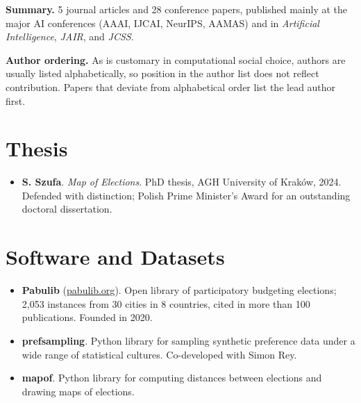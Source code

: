 \documentclass[11pt,a4paper]{article}
\begin{document}
\headercontactfalse
{}

\textbf{Summary.} 5 journal articles and 28 conference papers,
published mainly at the major AI conferences 
(AAAI, IJCAI, NeurIPS, AAMAS) and in
\emph{Artificial Intelligence}, \emph{JAIR}, and \emph{JCSS}.

\vspace{6pt}

\textbf{Author ordering.} As is customary in computational social choice,
authors are usually listed alphabetically, so position in the author list
does not reflect contribution. Papers that deviate from alphabetical order
list the lead author first.

\vspace{4pt}



\section{Thesis}
\begin{itemize}[label={},leftmargin=3.2em,itemsep=2.5pt]
  \item[\textbf{[T1]}] \textbf{S. Szufa}. \emph{Map of Elections}. PhD thesis,
  AGH University of Kraków, 2024. Defended with distinction; Polish Prime
  Minister's Award for an outstanding doctoral dissertation.
\end{itemize}

\section{Software and Datasets}
\begin{itemize}[label={},leftmargin=3.2em,itemsep=2.5pt]
  \item[\textbf{[S1]}] \textbf{Pabulib} (\href{https://pabulib.org}{pabulib.org}).
  Open library of participatory budgeting elections; 2{,}053 instances from 30
  cities in 8 countries, cited in more than 100 publications. Founded in
  2020.
  \item[\textbf{[S2]}] \textbf{prefsampling}. Python library for
  sampling synthetic preference data under a wide range of statistical
  cultures. Co-developed with Simon Rey.
  \item[\textbf{[S3]}] \textbf{mapof}. Python library for
  computing distances between elections and drawing maps of elections.
\end{itemize}
\end{document}
